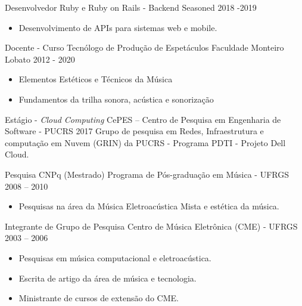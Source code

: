 \documentclass[10pt,a4paper]{altacv}
\begin{document}

\cvevent
{Desenvolvedor Ruby e Ruby on Rails - Backend}
{Seasoned}
{ 2018 -2019 }{}
\begin{itemize}
\item Desenvolvimento de APIs para sistemas web e mobile.
\end{itemize}
\divider


\cvevent
{Docente - Curso Tecnólogo de Produção de Espetáculos}
{Faculdade Monteiro Lobato}
{2012 - 2020}{}
\begin{itemize}
\item Elementos Estéticos e Técnicos da Música
\item Fundamentos da trilha sonora, acústica e sonorização
\end{itemize}
\divider


\cvevent
{Estágio - \textit{Cloud Computing}}
{CePES – Centro de Pesquisa em Engenharia de Software - PUCRS}
{ 2017 }{}
Grupo de pesquisa em Redes, Infraestrutura e computação em Nuvem (GRIN) da PUCRS - Programa PDTI - Projeto Dell Cloud.
\divider


\cvevent
{Pesquisa CNPq (Mestrado)}
{Programa de Pós-graduação em Música - UFRGS}
{2008 -- 2010}{}
\begin{itemize}
\item Pesquisas na área da Música Eletroacústica Mista e estética da música.
\end{itemize}
\divider


\cvevent
{Integrante de Grupo de Pesquisa}
{Centro de Música Eletrônica (CME) - UFRGS}
{2003 -- 2006}{}
\begin{itemize}
\item Pesquisas em música computacional e eletroacústica.
\item Escrita de artigo da área de música e tecnologia.
\item Ministrante de cursos de extensão do CME.
\end{itemize}
\divider
\end{document}
